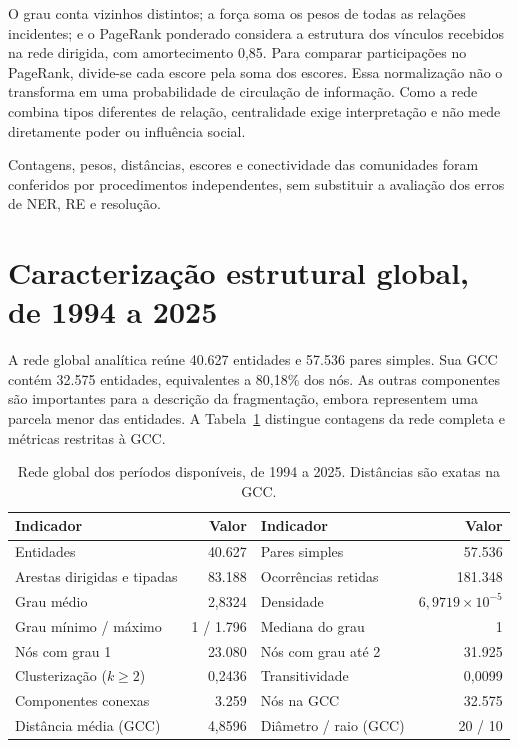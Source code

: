 \documentclass[11pt,a4paper]{article}
\begin{document}
O grau conta vizinhos distintos; a força soma os pesos de todas as relações incidentes; e o PageRank ponderado considera a estrutura dos vínculos recebidos na rede dirigida, com amortecimento 0,85. Para comparar participações no PageRank, divide-se cada escore pela soma dos escores. Essa normalização não o transforma em uma probabilidade de circulação de informação. Como a rede combina tipos diferentes de relação, centralidade exige interpretação e não mede diretamente poder ou influência social.

Contagens, pesos, distâncias, escores e conectividade das comunidades foram conferidos por procedimentos independentes, sem substituir a avaliação dos erros de NER, RE e resolução.

\clearpage
\section{Caracterização estrutural global, de 1994 a 2025}
A rede global analítica reúne 40.627 entidades e 57.536 pares simples. Sua GCC contém 32.575 entidades, equivalentes a 80,18\% dos nós. As outras componentes são importantes para a descrição da fragmentação, embora representem uma parcela menor das entidades. A Tabela~\ref{tab:global} distingue contagens da rede completa e métricas restritas à GCC.

\begin{table}[H]\centering\small
\caption{Rede global dos períodos disponíveis, de 1994 a 2025. Distâncias são exatas na GCC.}\label{tab:global}
\begin{tabularx}{\linewidth}{XrXr}\toprule
Indicador & Valor & Indicador & Valor\\\midrule
Entidades & 40.627 & Pares simples & 57.536\\
Arestas dirigidas e tipadas & 83.188 & Ocorrências retidas & 181.348\\
Grau médio & 2,8324 & Densidade & $6,9719\times10^{-5}$\\
Grau mínimo / máximo & 1 / 1.796 & Mediana do grau & 1\\
Nós com grau 1 & 23.080 & Nós com grau até 2 & 31.925\\
Clusterização ($k\geq2$) & 0,2436 & Transitividade & 0,0099\\
Componentes conexas & 3.259 & Nós na GCC & 32.575\\
Distância média (GCC) & 4,8596 & Diâmetro / raio (GCC) & 20 / 10\\\bottomrule
\end{tabularx}
\end{table}
\end{document}

